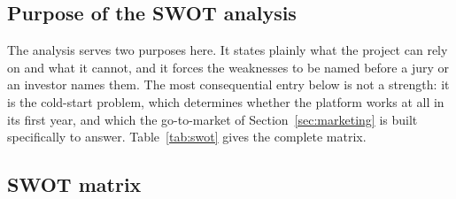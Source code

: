 \subsection{Purpose of the SWOT analysis}

The analysis serves two purposes here. It states plainly what the project can
rely on and what it cannot, and it forces the weaknesses to be named before a
jury or an investor names them. The most consequential entry below is not a
strength: it is the cold-start problem, which determines whether the platform
works at all in its first year, and which the go-to-market of
Section~\ref{sec:marketing} is built specifically to answer.
Table~\ref{tab:swot} gives the complete matrix.

\subsection{SWOT matrix}

